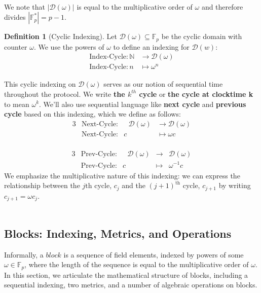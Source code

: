 \documentclass[10pt,letterpaper,titlepage]{article}
\newcommand{\GF}[1]{\mathbb{F}_{#1}}
\newcommand{\w}[0]{\omega}
\newcommand{\D}[0]{\mathcal{D}}
\theoremstyle{definition}
\newtheorem{definition}{Definition}
\begin{document}
\begin{appendices}
\\
We note that $|\D(\w)|$ is equal to the multiplicative order of $\w$ and therefore divides
$|\GF{p}^*|=p-1$.
\\
\begin{definition}[Cyclic Indexing]
Let $\D(\w)\subseteq\mathbb{F}_p$ be the cyclic domain with counter $\omega$.
We use the powers of $\omega$ to define an indexing for $\D(w)$:
\begin{align*}
  \text{Index-Cycle}:\mathbb{N}&\longrightarrow\D(\w)\\
  \text{Index-Cycle}:n&\longmapsto\w^n
\end{align*}
\end{definition}
\noindent
This cyclic indexing on $\D(\w)$ serves as our notion of sequential time throughout the protocol.
We write \textbf{the $k^{th}$ cycle} or \textbf{the cycle at clocktime k} to mean $\omega^k$.
We'll also use sequential language like \textbf{next cycle} and \textbf{previous cycle} based on this indexing, which we define as follows:
\begin{alignat*}{3}
 &\text{Next-Cycle}:&\text{ }\D(\w)&\longrightarrow\D(\w)\\
 &\text{Next-Cycle}:&c&\longmapsto\w c
\end{alignat*}
\\
\begin{alignat*}{3}
&\text{Prev-Cycle}:&\text{ }\D(\w)&\longrightarrow&\D(\w)\\
&\text{Prev-Cycle}:&c&\longmapsto&\w^{-1}c
\end{alignat*}
We emphasize the multiplicative nature of this indexing: we can express the relationship between the $j\text{th}$ cycle, $c_j$ and the $(j+1)^\text{th}$ cycle, $c_{j+1}$ by writing $c_{j+1}=\omega c_j$. \\
\\
\subsection{Blocks: Indexing, Metrics, and Operations}
\label{blocks}
Informally, a $\mathit{block}$ is a sequence of field elements, indexed by powers of some $\w\in\GF{p}$, where the length of the sequence is equal to the multiplicative order of $\w$.
In this section, we articulate the mathematical structure of blocks, including a sequential indexing, two metrics, and a number of algebraic operations on blocks.

\end{appendices}
\end{document}
